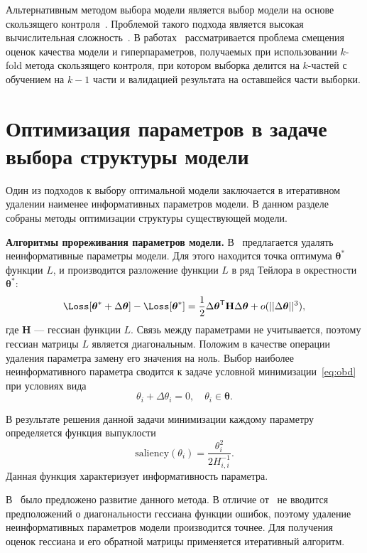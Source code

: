 Альтернативным методом выбора модели является выбор модели на основе скользящего контроля~\cite{cv_ms, tokmakova}. Проблемой такого подхода является высокая вычислительная сложность~\cite{expensive, expensive2}. В работах~\cite{bias,bias2} рассматривается проблема смещения оценок качества модели и гиперпараметров, получаемых при использовании $k$-fold метода скользящего контроля, при котором выборка делится на $k$-частей с обучением на $k-1$ части и валидацией результата на оставшейся части выборки. 


\section{Оптимизация параметров в задаче выбора структуры модели}
Один из подходов к выбору оптимальной модели заключается в итеративном удалении наименее информативных параметров модели. 
В данном разделе собраны методы оптимизации структуры существующей модели. 

\textbf{Алгоритмы прореживания параметров модели.}
В~\cite{obd} предлагается удалять неинформативные параметры модели.
Для этого находится точка оптимума $\boldsymbol{\theta}^{*}$ функции $L$, и производится разложение функции $L$ в ряд Тейлора в окрестности $\boldsymbol{\theta}^{*}$:
\begin{equation}
\label{eq:obd}
    \Loss[\boldsymbol{\theta}^{*} + \Delta\boldsymbol{\theta}]  - \Loss[\boldsymbol{\theta}^{*}] = \frac{1}{2} \Delta\boldsymbol{\theta}^{\mathsf{T}}\mathbf{H}\Delta\boldsymbol{\theta} + o(||\Delta\boldsymbol{\theta}||^{3}),
\end{equation}
где $\mathbf{H}$ --- гессиан функции $L$. Связь между параметрами не учитывается, поэтому гессиан матрицы $L$ является диагональным.
Положим в качестве операции удаления параметра замену его значения на ноль. Выбор наиболее неинформативного параметра сводится к задаче условной минимизации~\eqref{eq:obd} при условиях вида
\[
    {\theta}_i + \Delta{\theta}_i = 0, \quad  {\theta}_i \in \boldsymbol{\theta}.
\] 

В результате решения данной задачи минимизации каждому параметру определяется функция выпуклости
\[
    \text{saliency}({\theta}_i) = \frac{{\theta}^2_i}{2H^{-1}_{i,i}}.
\]
Данная функция характеризует информативность параметра.

В~\cite{obs} было предложено развитие данного метода. В отличие от~\cite{obd} не вводится предположений о диагональности гессиана функции ошибок, поэтому удаление неинформативных параметров модели производится точнее. Для получения оценок гессиана и его обратной матрицы применяется итеративный алгоритм.

